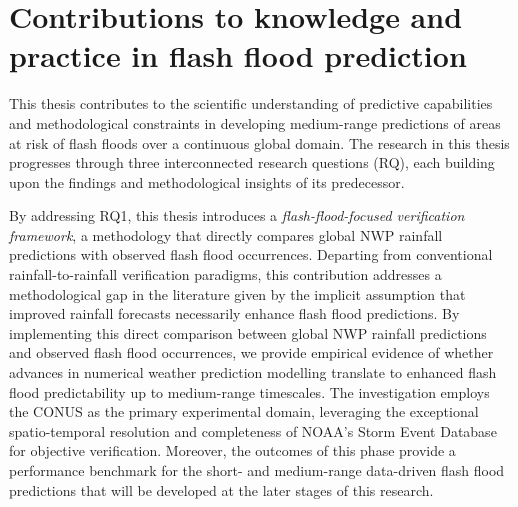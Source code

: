 \section{Contributions to knowledge and practice in flash flood prediction}
\label{general_introduction_contribution_to_knowledge}

This thesis contributes to the scientific understanding of predictive capabilities and methodological constraints in developing medium-range predictions of areas at risk of flash floods over a continuous global domain. The research in this thesis progresses through three interconnected research questions (RQ), each building upon the findings and methodological insights of its predecessor.

By addressing RQ1, this thesis introduces a \textit{flash-flood-focused verification framework}, a methodology that directly compares global NWP rainfall predictions with observed flash flood occurrences. Departing from conventional rainfall-to-rainfall verification paradigms, this contribution addresses a methodological gap in the literature given by the implicit assumption that improved rainfall forecasts necessarily enhance flash flood predictions. By implementing this direct comparison between global NWP rainfall predictions and observed flash flood occurrences, we provide empirical evidence of whether advances in numerical weather prediction modelling translate to enhanced flash flood predictability up to medium-range timescales. The investigation employs the CONUS as the primary experimental domain, leveraging the exceptional spatio-temporal resolution and completeness of NOAA's Storm Event Database for objective verification. Moreover, the outcomes of this phase provide a performance benchmark for the short- and medium-range data-driven flash flood predictions that will be developed at the later stages of this research. 

